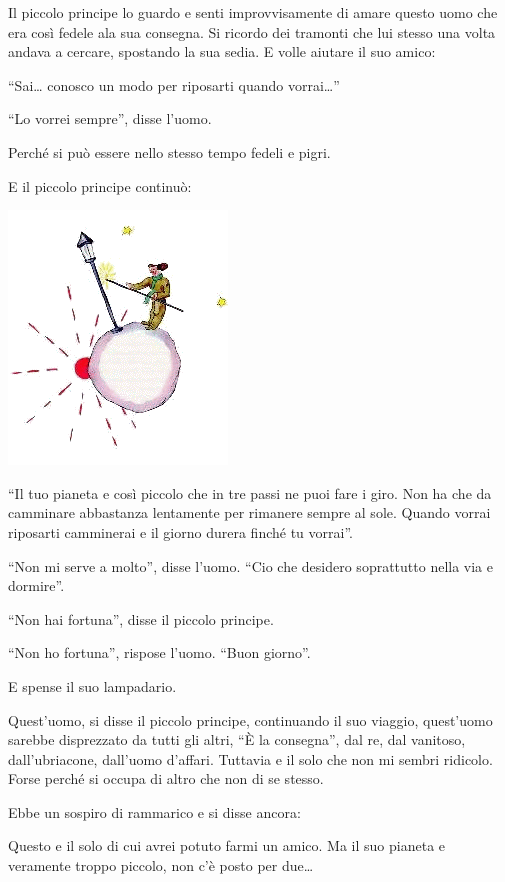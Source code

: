 \documentclass[11pt]{scrbook}
\begin{document}
Il piccolo principe lo guardo e senti improvvisamente di amare questo
uomo che era così fedele ala sua consegna. Si ricordo dei tramonti che
lui stesso una volta andava a cercare, spostando la sua sedia. E volle
aiutare il suo amico:

``Sai\ldots{} conosco un modo per riposarti quando vorrai\ldots{}''

``Lo vorrei sempre'', disse l'uomo.

Perché si può essere nello stesso tempo fedeli e pigri.

E il piccolo principe continuò:

\begin{center}
\includegraphics{./img/14a.png}
\end{center}

``Il tuo pianeta e così piccolo che in tre passi ne puoi fare i giro.
Non ha che da camminare abbastanza lentamente per rimanere sempre al
sole. Quando vorrai riposarti camminerai e il giorno durera finché tu
vorrai''.

``Non mi serve a molto'', disse l'uomo. ``Cio che desidero soprattutto
nella via e dormire''.

``Non hai fortuna'', disse il piccolo principe.

``Non ho fortuna'', rispose l'uomo. ``Buon giorno''.

E spense il suo lampadario.

Quest'uomo, si disse il piccolo principe, continuando il suo viaggio,
quest'uomo sarebbe disprezzato da tutti gli altri, ``È la consegna'',
dal re, dal vanitoso, dall'ubriacone, dall'uomo d'affari. Tuttavia e il
solo che non mi sembri ridicolo. Forse perché si occupa di altro che non
di se stesso.

Ebbe un sospiro di rammarico e si disse ancora:

Questo e il solo di cui avrei potuto farmi un amico. Ma il suo pianeta e
veramente troppo piccolo, non c'è posto per due\ldots{}
\end{document}

